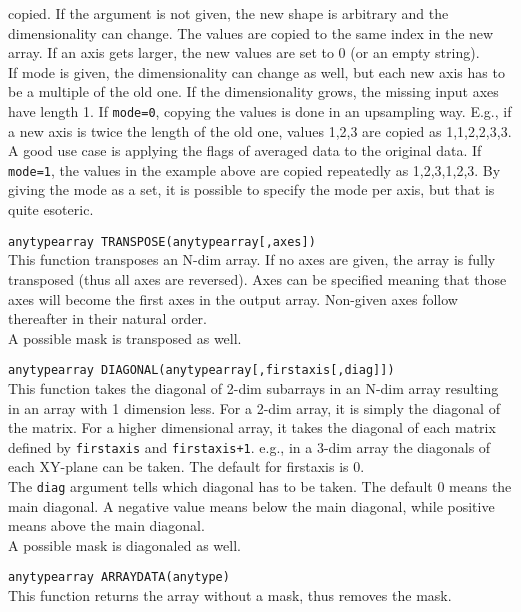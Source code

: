 \begin{description}
    copied. If the argument is not given, the new shape is arbitrary
    and the dimensionality can change. The values are copied to the same index in the
    new array. If an axis gets larger, the new values are set to 0
    (or an empty string).
    \\If mode is given, the dimensionality can change as well, but
    each new axis has to be a multiple of the old one. If the
    dimensionality grows, the missing input axes have length 1.
    If \texttt{mode=0}, copying the values is
    done in an upsampling way. E.g., if a new axis is twice the length
    of the old one, values 1,2,3 are copied as 1,1,2,2,3,3. A good use case is
    applying the flags of averaged data to the original data. 
    If \texttt{mode=1}, the values in the example above are copied
    repeatedly as 1,2,3,1,2,3.
    By giving the mode as a set, it is possible to specify the mode
    per axis, but that is quite esoteric. 
  \item[] \texttt{anytypearray TRANSPOSE(anytypearray[,axes])}\\
    This function transposes an N-dim array. If no axes
    are given, the array is fully transposed (thus all axes are
    reversed). Axes can be specified meaning that those axes will become the
    first axes in the output array. Non-given axes follow thereafter
    in their natural order.
    \\A possible mask is transposed as well.
  \item[] \texttt{anytypearray DIAGONAL(anytypearray[,firstaxis[,diag]])}\\
    This function takes the diagonal of 2-dim subarrays in an N-dim array resulting in
    an array with 1 dimension less. For a 2-dim array, it is simply the
    diagonal of the matrix. For a higher dimensional array, it takes
    the diagonal of each matrix defined by \texttt{firstaxis} and
    \texttt{firstaxis+1}. e.g., in a 3-dim array the
    diagonals of each XY-plane can be taken. The default for firstaxis
    is 0.
    \\The \texttt{diag} argument tells which diagonal has to be
    taken. The default 0 means the main diagonal. A negative value means
    below the main diagonal, while positive means above the main diagonal.
    \\A possible mask is diagonaled as well.
 \item[] \texttt{anytypearray ARRAYDATA(anytype)}\\
    This function returns the array without a mask, thus removes the mask.

\end{description}
